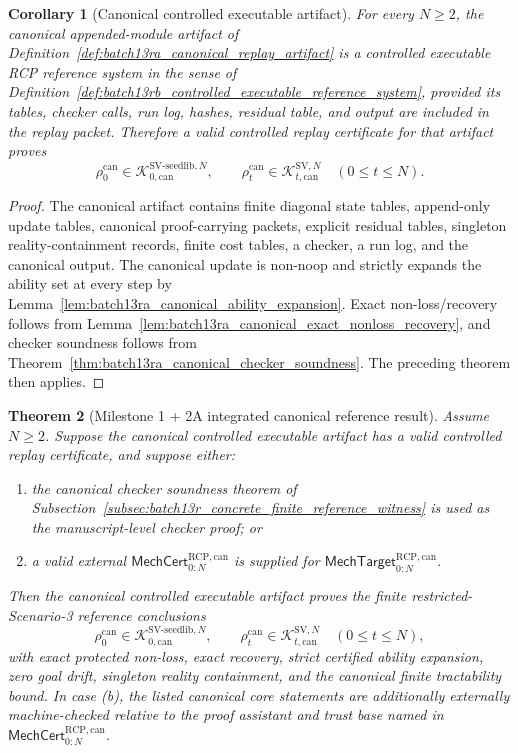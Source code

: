 \documentclass[11pt]{article}
\newtheorem{theorem}{Theorem}[section]
\newtheorem{corollary}[theorem]{Corollary}
\newcommand{\1}{\mathbf{1}}
\newcommand{\RCP}{\mathrm{RCP}}
\providecommand{\Kcal}{\mathcal{K}}
\begin{document}
\begin{corollary}[Canonical controlled executable artifact]
\label{cor:batch13rb_canonical_controlled_executable_artifact}
For every \(N\ge2\), the canonical appended-module artifact of Definition~\ref{def:batch13ra_canonical_replay_artifact} is a controlled executable RCP reference system in the sense of Definition~\ref{def:batch13rb_controlled_executable_reference_system}, provided its tables, checker calls, run log, hashes, residual table, and output are included in the replay packet.  Therefore a valid controlled replay certificate for that artifact proves
\[
\rho_0^{\mathrm{can}}\in\Kcal_{0,\mathrm{can}}^{\mathrm{SV\mbox{-}seedlib},N},
\qquad
\rho_t^{\mathrm{can}}\in\Kcal_{t,\mathrm{can}}^{\mathrm{SV},N}
\quad(0\le t\le N).
\]
\end{corollary}

\begin{proof}
The canonical artifact contains finite diagonal state tables, append-only update tables, canonical proof-carrying packets, explicit residual tables, singleton reality-containment records, finite cost tables, a checker, a run log, and the canonical output.  The canonical update is non-noop and strictly expands the ability set at every step by Lemma~\ref{lem:batch13ra_canonical_ability_expansion}.  Exact non-loss/recovery follows from Lemma~\ref{lem:batch13ra_canonical_exact_nonloss_recovery}, and checker soundness follows from Theorem~\ref{thm:batch13ra_canonical_checker_soundness}.  The preceding theorem then applies.
\end{proof}

\begin{theorem}[Milestone 1 + 2A integrated canonical reference result]
\label{thm:batch13rb_milestone1_2a_integrated_canonical_result}
Assume \(N\ge2\).  Suppose the canonical controlled executable artifact has a valid controlled replay certificate, and suppose either:
\begin{enumerate}[label=(\alph*),leftmargin=1.5em]
    \item the canonical checker soundness theorem of Subsection~\ref{subsec:batch13r_concrete_finite_reference_witness} is used as the manuscript-level checker proof; or
    \item a valid external \(\mathsf{MechCert}_{0:N}^{\RCP,\mathrm{can}}\) is supplied for \(\mathsf{MechTarget}_{0:N}^{\RCP,\mathrm{can}}\).
\end{enumerate}
Then the canonical controlled executable artifact proves the finite restricted-Scenario-3 reference conclusions
\[
\rho_0^{\mathrm{can}}\in\Kcal_{0,\mathrm{can}}^{\mathrm{SV\mbox{-}seedlib},N},
\qquad
\rho_t^{\mathrm{can}}\in\Kcal_{t,\mathrm{can}}^{\mathrm{SV},N}
\quad(0\le t\le N),
\]
with exact protected non-loss, exact recovery, strict certified ability expansion, zero goal drift, singleton reality containment, and the canonical finite tractability bound.  In case (b), the listed canonical core statements are additionally externally machine-checked relative to the proof assistant and trust base named in \(\mathsf{MechCert}_{0:N}^{\RCP,\mathrm{can}}\).
\end{theorem}
\end{document}
